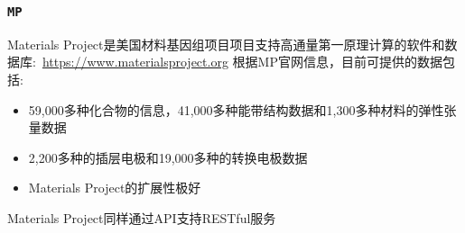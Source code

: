 {{\frame
{
\frametitle{\tt{MP}}
\textrm{Materials Project}是美国材料基因组项目项目支持高通量第一原理计算的软件和数据库:~\url{https://www.materialsproject.org}%
\vskip 2pt
{\fontsize{8.5pt}{4.2pt}}
\vskip 3pt
根据\textrm{MP}官网信息，目前可提供的数据包括:
\begin{itemize}
	\item \textrm{59,000}多种化合物的信息，\textrm{41,000}多种能带结构数据和\textrm{1,300}多种材料的弹性张量数据
	\item \textrm{2,200}多种\textrm{}的插层电极和\textrm{19,000}多种\textrm{}的转换电极数据
	\item \textrm{Materials Project}的扩展性极好\\
		{\fontsize{8.0pt}{4.2pt}}%
\end{itemize}

\textrm{Materials Project}同样通过\textrm{API}支持\textrm{RESTful}服务%
}

}}
